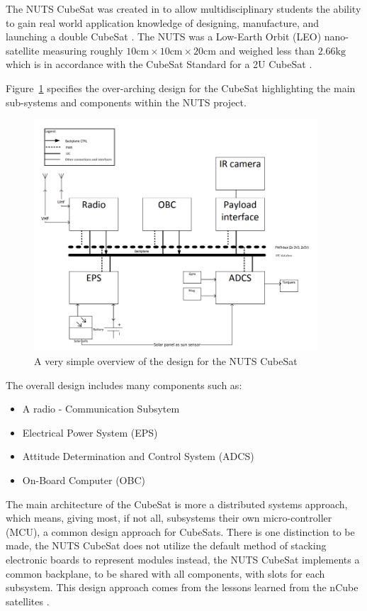 \documentclass[12pt, a4paper]{report}
\begin{document}
The NUTS CubeSat was created in to allow multidisciplinary students the ability to gain real world application knowledge of designing, manufacture, and launching a double CubeSat \cite{power_distribution}. The NUTS was a Low-Earth Orbit (LEO) nano-satellite measuring roughly \(10 \unit{\centi\meter} \times 10 \unit{\centi\meter} \times 20 \unit{\centi\meter}\) and weighed less than \(2.66 \unit{\kilo\gram}\) which is in accordance with the CubeSat Standard for a 2U CubeSat \cite{power_distribution}\cite{cubesat_standard}.

Figure~\ref{fig:overall_design} specifies the over-arching design for the CubeSat highlighting the main sub-systems and components within the NUTS project. 

\begin{figure}[H]
    \centering
    \includegraphics[width=300pt]{images/nuts_design.PNG}
    \caption{A very simple overview of the design for the NUTS CubeSat\cite{overview}}
    \label{fig:overall_design}
\end{figure}

The overall design includes many components such as:

\begin{itemize}
    \item A radio - Communication Subsytem
    \item Electrical Power System (EPS)
    \item Attitude Determination and Control System (ADCS)
    \item On-Board Computer (OBC)
\end{itemize}

The main architecture of the CubeSat is more a distributed systems approach, which means, giving most, if not all, subsystems their own micro-controller (MCU), a common design approach for CubeSats. There is one distinction to be made, the NUTS CubeSat does not utilize the default method of stacking electronic boards to represent modules instead, the NUTS CubeSat implements a common backplane, to be shared with all components, with slots for each subsystem. This design approach comes from the lessons learned from the nCube satellites \cite{overview}. 
\end{document}

